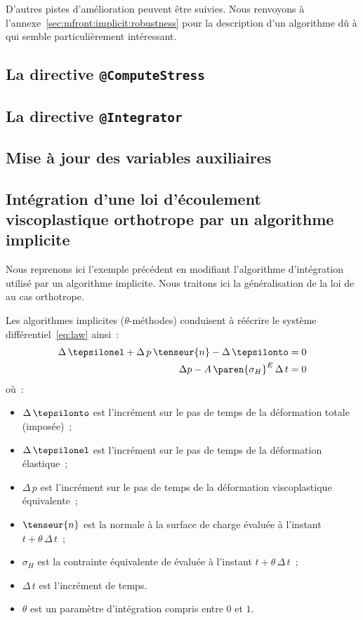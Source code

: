 \documentclass[rectoverso,pleiades,pstricks,leqno,anti]{texmf/note_technique_2010}
\newcommand{\sigmaH}{\ensuremath{\sigma_{H}}}
\begin{document}
D'autres pistes d'amélioration peuvent être suivies. Nous renvoyons à
l'annexe~\ref{sec:mfront:implicit:robustness} pour la description d'un
algorithme dû à  qui semble particulièrement intéressant.

\subsection{La directive \texttt{@ComputeStress}}

\subsection{La directive \texttt{@Integrator}}

\subsection{Mise à jour des variables auxiliaires}

\subsection{Intégration d'une loi d'écoulement viscoplastique
  orthotrope par un algorithme implicite}

Nous reprenons ici l'exemple précédent en modifiant l'algorithme
d'intégration utilisé par un algorithme implicite. Nous traitons ici la
généralisation de la loi de  au cas orthotrope.

Les algorithmes implicites (\(\theta\)-méthodes) conduisent à réécrire
le système différentiel~\eqref{eq:law} ainsi~:
\begin{equation}
  \begin{aligned}
    \Delta\,\tepsilonel + \Delta\,p\,\tenseur{n} - \Delta\,\tepsilonto &= 0 \\
    \Delta{p}   - A\,\paren{\sigmaH}^{E}\,\Delta\, t &= 0 \\
  \end{aligned}
\end{equation}
où~:
\begin{minipage}[t]{0.8\linewidth}
  \begin{itemize}
  \item \(\Delta\,\tepsilonto\) est l'incrément sur le pas de temps de
    la déformation totale (imposée)~;
  \item \(\Delta\,\tepsilonel\) est l'incrément sur le pas de temps de
    la déformation élastique~;
  \item \(\Delta\,p\) est l'incrément sur le pas de temps de la
    déformation viscoplastique équivalente~;
  \item \(\tenseur{n}\) est la normale à la surface de charge évaluée
    à l'instant \(t+\theta\,\Delta\,t\)~;
  \item \(\sigmaH\) est la contrainte équivalente de 
    évaluée à l'instant \(t+\theta\,\Delta\,t\)~;
  \item \(\Delta\,t\) est l'incrément de temps.
  \item \(\theta\) est un paramètre d'intégration compris entre \(0\)
    et \(1\).
  \end{itemize}
\end{minipage}
\end{document}
